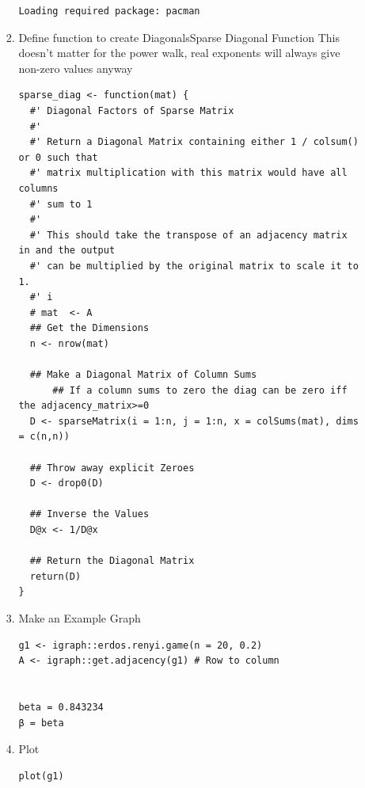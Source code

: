 \documentclass[11pt]{article}
\begin{document}
\begin{enumerate}
\begin{enumerate}
\begin{enumerate}
\begin{verbatim}
Loading required package: pacman
\end{verbatim}

\item Define function to create DiagonalsSparse Diagonal Function
\label{sec:orgb0b03dc}
This doesn't matter for the power walk, real exponents will always give non-zero values anyway
\lstset{language=r,label= ,caption= ,captionpos=b,numbers=none}
\begin{lstlisting}
sparse_diag <- function(mat) {
  #' Diagonal Factors of Sparse Matrix
  #'
  #' Return a Diagonal Matrix containing either 1 / colsum() or 0 such that
  #' matrix multiplication with this matrix would have all columns
  #' sum to 1
  #'
  #' This should take the transpose of an adjacency matrix in and the output
  #' can be multiplied by the original matrix to scale it to 1.
  #' i
  # mat  <- A
  ## Get the Dimensions
  n <- nrow(mat)

  ## Make a Diagonal Matrix of Column Sums
      ## If a column sums to zero the diag can be zero iff the adjacency_matrix>=0
  D <- sparseMatrix(i = 1:n, j = 1:n, x = colSums(mat), dims = c(n,n))

  ## Throw away explicit Zeroes
  D <- drop0(D)

  ## Inverse the Values
  D@x <- 1/D@x

  ## Return the Diagonal Matrix
  return(D)
}
\end{lstlisting}

\item Make an Example Graph
\label{sec:org3fb60b8}
\lstset{language=r,label= ,caption= ,captionpos=b,numbers=none}
\begin{lstlisting}
g1 <- igraph::erdos.renyi.game(n = 20, 0.2)
A <- igraph::get.adjacency(g1) # Row to column


beta = 0.843234
β = beta
\end{lstlisting}
\item Plot
\label{sec:orga1c99a1}

\lstset{language=r,label= ,caption= ,captionpos=b,numbers=none}
\begin{lstlisting}
plot(g1)
\end{lstlisting}


\end{enumerate}
\end{enumerate}
\end{enumerate}
\end{document}
